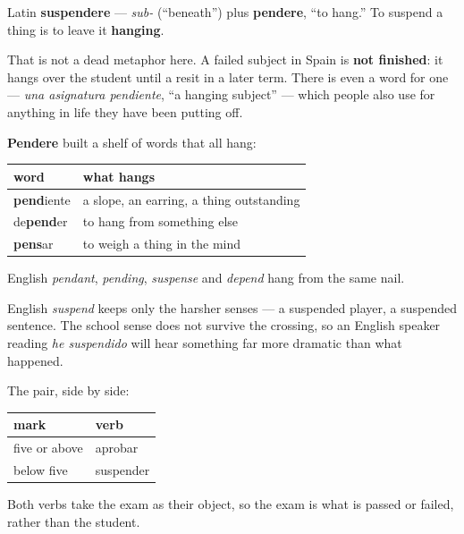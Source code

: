 \begin{cousinweb}
Latin \textbf{suspendere} — \emph{sub-} (\textquotedblleft{}beneath\textquotedblright{}) plus \textbf{pendere}, \textquotedblleft{}to hang.\textquotedblright{} To suspend a thing is to leave it \textbf{hanging}.

That is not a dead metaphor here. A failed subject in Spain is \textbf{not finished}: it hangs over the student until a resit in a later term. There is even a word for one — \emph{una asignatura pendiente}, \textquotedblleft{}a hanging subject\textquotedblright{} — which people also use for anything in life they have been putting off.

\textbf{Pendere} built a shelf of words that all hang:

\noindent
\begin{tabularx}{\linewidth}{@{}>{\raggedright\arraybackslash}X>{\raggedright\arraybackslash}X@{}}
\toprule
\textbf{word} & \textbf{what hangs} \\
\midrule
\textbf{pend}iente & a slope, an earring, a thing outstanding \\
de\textbf{pend}er & to hang from something else \\
\textbf{pens}ar & to weigh a thing in the mind \\
\bottomrule
\end{tabularx}

English \emph{pendant}, \emph{pending}, \emph{suspense} and \emph{depend} hang from the same nail.
\end{cousinweb}

\begin{grammarlens}[title={Grammar Lens: the English false friend, and the Spanish one}]
English \emph{suspend} keeps only the harsher senses — a suspended player, a suspended sentence. The school sense does not survive the crossing, so an English speaker reading \emph{he suspendido} will hear something far more dramatic than what happened.

The pair, side by side:

\noindent
\begin{tabularx}{\linewidth}{@{}>{\raggedright\arraybackslash}X>{\raggedright\arraybackslash}X@{}}
\toprule
\textbf{mark} & \textbf{verb} \\
\midrule
five or above & aprobar \\
below five & suspender \\
\bottomrule
\end{tabularx}

Both verbs take the exam as their object, so the exam is what is passed or failed, rather than the student.
\end{grammarlens}

